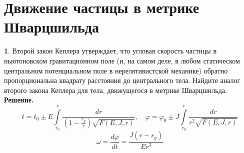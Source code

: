 \documentclass[12pt]{article}
\theoremstyle{definition}
\newtheorem{zad}{}[section]
\begin{document}
\section{Движение частицы в метрике Шварцшильда}
\begin{zad}
Второй закон Кеплера утверждает, что угловая скорость частицы в ньютоновском гравитационном поле (и, на самом деле, в любом статическом центральном потенциальном поле в нерелятивистской механике) обратно пропорциональна квадрату расстояния до центрального тела. Найдите аналог второго закона Кеплера для тела, движущегося в метрике Шварцшильда.\\
\textbf{Решение.}
\begin{equation}
    t=t_0\pm E\int\limits_{r_0}^r\frac{dr}{(1-\frac{r_g}{r})\sqrt{F(E,J,r)}},\quad\varphi=\varphi_0\pm J\int\limits_{r_0}^r\frac{dr}{r^2\sqrt{F(E,J,r)}}
\end{equation}
\begin{equation}
    \boxed{\omega=\frac{d\varphi}{dt}=\frac{J(r-r_g)}{Er^3}}
\end{equation}
\end{zad}
\end{document}
